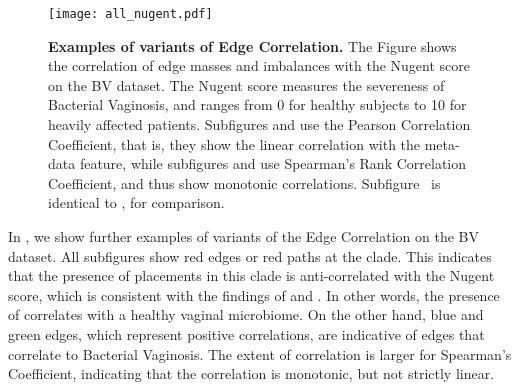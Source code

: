 %
%


\begin{figure}[!hpbt]
    \centering
    \texttt{[image: all\_nugent.pdf]}
    \begin{subfigure}{0pt}
        \label{fig:all_nugent:sub:pcc_em}
    \end{subfigure}
    \begin{subfigure}{0pt}
        \label{fig:all_nugent:sub:pcc_ei}
    \end{subfigure}
    \begin{subfigure}{0pt}
        \label{fig:all_nugent:sub:srcc_em}
    \end{subfigure}
    \begin{subfigure}{0pt}
        \label{fig:all_nugent:sub:srcc_ei}
    \end{subfigure}
    \caption[Examples of variants of Edge Correlation]{
        \textbf{Examples of variants of Edge Correlation.}
        The Figure shows the correlation of edge masses and imbalances with the Nugent score on the \ac{BV} dataset.
        The Nugent score measures the severeness of Bacterial Vaginosis,
        and ranges from \num{0} for healthy subjects to \num{10} for heavily affected patients.
        Subfigures  and  use the
        Pearson Correlation Coefficient, that is, they show the linear correlation with the meta-data feature,
        while subfigures  and  use
        Spearman's Rank Correlation Coefficient, and thus show monotonic correlations.
        Subfigure~ is identical to , for comparison.
    }
    \label{fig:all_nugent}
\end{figure}

In , we show further examples of variants of the Edge Correlation on the \ac{BV} dataset.
All subfigures show red edges or red paths at the  clade.
This indicates that the presence of placements in this clade is anti-correlated with the Nugent score,
which is consistent with the findings of  and .
In other words, the presence of  correlates with a healthy vaginal microbiome.
On the other hand, blue and green edges, which represent positive correlations,
are indicative of edges that correlate to Bacterial Vaginosis.
The extent of correlation is larger for Spearman's Coefficient,
indicating that the correlation is monotonic, but not strictly linear.

